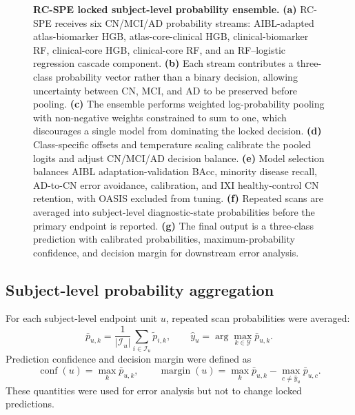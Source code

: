 \documentclass[12pt,a4paper]{article}
\begin{document}
\begin{figure}[p]
    \centering
    \caption{\textbf{RC-SPE locked subject-level probability ensemble.} \textbf{(a)} RC-SPE receives six CN/MCI/AD probability streams: AIBL-adapted atlas-biomarker HGB, atlas-core-clinical HGB, clinical-biomarker RF, clinical-core HGB, clinical-core RF, and an RF--logistic regression cascade component. \textbf{(b)} Each stream contributes a three-class probability vector rather than a binary decision, allowing uncertainty between CN, MCI, and AD to be preserved before pooling. \textbf{(c)} The ensemble performs weighted log-probability pooling with non-negative weights constrained to sum to one, which discourages a single model from dominating the locked decision. \textbf{(d)} Class-specific offsets and temperature scaling calibrate the pooled logits and adjust CN/MCI/AD decision balance. \textbf{(e)} Model selection balances AIBL adaptation-validation BAcc, minority disease recall, AD-to-CN error avoidance, calibration, and IXI healthy-control CN retention, with OASIS excluded from tuning. \textbf{(f)} Repeated scans are averaged into subject-level diagnostic-state probabilities before the primary endpoint is reported. \textbf{(g)} The final output is a three-class prediction with calibrated probabilities, maximum-probability confidence, and decision margin for downstream error analysis.}
    \label{fig:v6_model}
\end{figure}

\subsection{Subject-level probability aggregation}
\label{sec:subject_aggregation}

For each subject-level endpoint unit $u$, repeated scan probabilities were averaged:
\begin{equation}
\bar{p}_{u,k} =
\frac{1}{|\mathcal{I}_u|}
\sum_{i\in\mathcal{I}_u}\tilde{p}_{i,k},
\qquad
\hat{y}_u = \arg\max_{k\in\mathcal{Y}}\bar{p}_{u,k}.
\label{eq:v6_subject_average}
\end{equation}
Prediction confidence and decision margin were defined as
\begin{equation}
\operatorname{conf}(u)=\max_k \bar{p}_{u,k},
\qquad
\operatorname{margin}(u)=
\max_k \bar{p}_{u,k}
-
\max_{c\neq \hat{y}_u}\bar{p}_{u,c}.
\label{eq:confidence_margin}
\end{equation}
These quantities were used for error analysis but not to change locked predictions.
\end{document}

